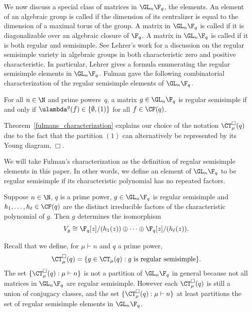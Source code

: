 We now discuss a special class of matrices in $\GL_n \F_q$, the  elements.
An element of an algebraic group is called  if the dimension of its centralizer is equal to the dimension of a maximal torus of the group.
A matrix in $\GL_n \F_q$ is called  if it is diagonalizable over an algebraic closure of $\F_q$.
A matrix in $\GL_n \F_q$ is called  if it is both regular and semisimple.
See Lehrer's work \cite{lehrer} for a discussion on the regular semisimple variety in algebraic groups in both characteristic zero and positive characteristic.
In particular, Lehrer gives a formula \cite[Corollary~8.5]{lehrer} enumerating the regular semisimple elements in \(\GL_n \F_q\).
Fulman gave the following combinatorial characterization of the regular semisimple elements of $\GL_n \F_q$.

\begin{theorem}
\label{fulmans_characterization}
For all \(n \in \N\) and prime powers~\(q\), a matrix $g \in \GL_n \F_q$ is regular semisimple if and only if $\ulambda^g (f) \in \{\emptyset, (1)\}$ for all $f \in \CF (q)$.
\end{theorem}

\begin{remark}
	Theorem~\ref{fulmans_characterization} explains our choice of the notation \(\CT^\Box_\mu (q)\) due to the fact that the partition \((1)\) can alternatively be represented by its Young diagram, \(\Box\).
\end{remark}

We will take Fulman's characterization as the definition of regular semisimple elements in this paper.
In other words, we define an element of \(\GL_n \F_q\) to be regular semisimple if its characteristic polynomial has no repeated factors.

\begin{corollary}
\label{rs_rcf_corollary}
Suppose \(n \in \N\), \(q\) is a prime power, \(g \in \GL_n \F_q\) is regular semisimple and \(h_1,\ldots,h_\ell \in \CF (q)\) are the distinct irreducible factors of the characteristic polynomial of \(g\).
Then \(g\) determines the isomorphism
\begin{equation}
\label{rs_rcf}
V_g \cong
{\F_q[z]} / {(h_1(z))}
\oplus
\cdots
\oplus
{\F_q[z]} / {(h_{\ell} (z))}.
\end{equation}
\end{corollary}


Recall that we define, for \(\mu \vdash n\) and \(q\) a prime power,
\begin{equation}
\CT^\Box_\mu (q)
=
\{g \in \CT_\mu (q) : g \text{ is regular semisimple}\}.
\end{equation}
The set $\{ \CT_\mu^\Box (q) : \mu \vdash n \}$ is not a partition of $\GL_n \F_q$ in general because not all matrices in $\GL_n \F_q$ are regular semisimple.
However each $\CT^\Box_\mu (q)$ is still a union of conjugacy classes, and the set $\{\CT^\Box_\mu (q) : \mu \vdash n\}$ at least partitions the set of regular semisimple elements in $\GL_n \F_q$.

